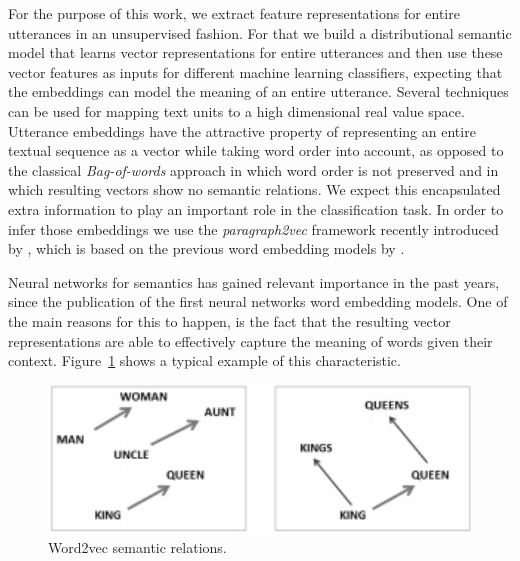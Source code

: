 For the purpose of this work, we extract feature representations for entire utterances in an unsupervised fashion.
For that we build a distributional semantic model that learns vector representations for entire utterances and then use these vector features as inputs for different machine learning classifiers, expecting that the embeddings can model the meaning of an entire utterance.
Several techniques can be used for mapping text units to a high dimensional real value space.
Utterance embeddings have the attractive property of representing an entire textual sequence as a vector while taking word order into account, as opposed to the classical \emph{Bag-of-words} approach in which word order is not preserved and in which resulting vectors show no semantic relations.
We expect this encapsulated extra information to play an important role in the classification task. In order to infer those embeddings we use the \emph{paragraph2vec} framework recently introduced by \cite{le2014distributed}, which is based on the previous word embedding models by \cite{mikolov2013efficient}.


Neural networks for semantics has gained relevant importance in the past years, since the publication of the first neural networks word embedding models. One of the main reasons for this to happen, is the fact that the resulting vector representations are able to effectively capture the meaning of words given their context. Figure~\ref{fig:w2v_example} shows a typical example of this characteristic. 


\begin{figure}
\centering
\begin{minipage}{.4\textwidth}
\includegraphics[width=1\textwidth]{img/w2v_example}
\caption{Word2vec semantic relations.}
\label{fig:w2v_example}
\end{minipage}
\end{figure}

